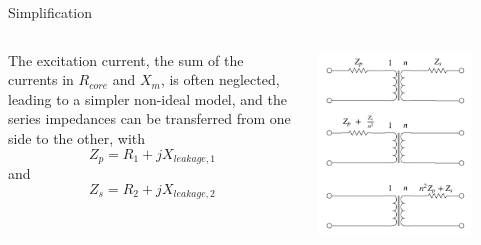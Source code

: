 \begin{frame}{Simplification}

\begin{columns}
\begin{column}{0.45\textwidth}
    The excitation current, the sum of the currents in $R_{core}$ and $X_m$, is often neglected, 
    leading to a simpler non-ideal model, and the series impedances can be transferred from one side to the other, 
    with $$Z_p = R_1 + jX_{leakage, 1}$$ and $$Z_s = R_2 + jX_{leakage, 2}$$
\end{column}
\begin{column}{0.5\textwidth}
    \includegraphics[width=0.8\textwidth]{images/non-ideal-transformer-2.png}
\end{column}
\end{columns}
\end{frame}

